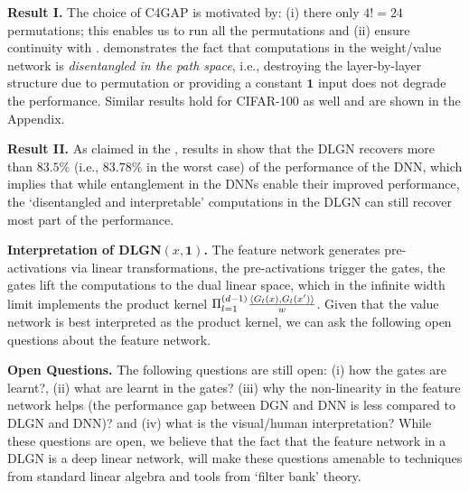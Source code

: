\textbf{Result I.} The choice of C4GAP is motivated by: (i) there only $4!=24$ permutations; this enables us to run all the permutations and (ii) ensure continuity with \citep{arora2019exact,npk}.   demonstrates the fact that computations in the weight/value network is \emph{disentangled in the path space}, i.e., destroying the layer-by-layer structure due to permutation or providing a constant $\mathbf{1}$ input does not degrade the performance.  Similar results hold for CIFAR-100 as well and are shown in the Appendix.

\textbf{Result II.} As claimed in the , results in  show that the DLGN recovers more than $83.5\%$ (i.e., $83.78\%$ in the worst case) of the performance of the DNN, which implies that while entanglement in the DNNs enable their improved performance,  the `disentangled and interpretable'  computations in the DLGN can still recover most part of the performance. %

\textbf{Interpretation of DLGN$(x,\mathbf{1})$.} The feature network generates pre-activations via linear transformations, the pre-activations trigger the gates, the gates lift the computations to the dual linear space, which in the infinite width limit implements the product kernel $\Pi_{l=1}^{(d-1)} \frac{\langle G_l(x),G_l(x')\rangle}{w}$. Given that the value network is best interpreted as the product kernel, we can ask the following open questions about the feature network.

\textbf{Open Questions.} The following questions are still open: (i) how the gates are learnt?, (ii) what are learnt in the gates? (iii) why the non-linearity in the feature network helps (the performance gap between DGN and DNN is less compared to DLGN and DNN)? and (iv) what is the visual/human interpretation? While these questions are open, we believe that the fact that the feature network in a DLGN is a deep linear network, will make these questions amenable to techniques from standard linear algebra and tools from `filter bank' theory.  %






